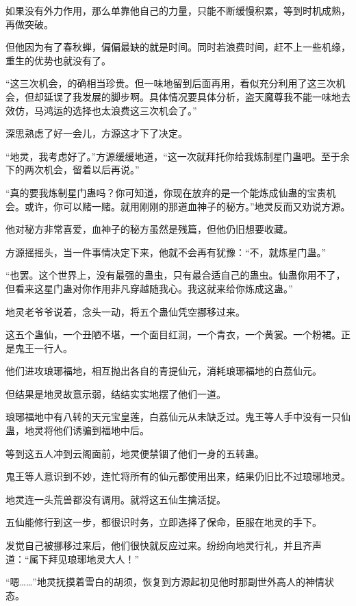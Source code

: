 
\begin{this_body}

如果没有外力作用，那么单靠他自己的力量，只能不断缓慢积累，等到时机成熟，再做突破。

但他因为有了春秋蝉，偏偏最缺的就是时间。同时若浪费时间，赶不上一些机缘，重生的优势也就没有了。

“这三次机会，的确相当珍贵。但一味地留到后面再用，看似充分利用了这三次机会，但却延误了我发展的脚步啊。具体情况要具体分析，盗天魔尊我不能一味地去效仿，马鸿运的选择也太浪费这三次机会了。”

深思熟虑了好一会儿，方源这才下了决定。

“地灵，我考虑好了。”方源缓缓地道，“这一次就拜托你给我炼制星门蛊吧。至于余下的两次机会，留着以后再说。”

“真的要我炼制星门蛊吗？你可知道，你现在放弃的是一个能炼成仙蛊的宝贵机会。或许，你可以赌一赌。就用刚刚的那道血神子的秘方。”地灵反而又劝说方源。

他对秘方非常喜爱，血神子的秘方虽然是残篇，但他仍旧想要收藏。

方源摇摇头，当一件事情决定下来，他就不会再有犹豫：“不，就炼星门蛊。”

“也罢。这个世界上，没有最强的蛊虫，只有最合适自己的蛊虫。仙蛊你用不了，但看来这星门蛊对你作用非凡穿越随我心。我这就来给你炼成这蛊。”

地灵老爷爷说着，念头一动，将五个蛊仙凭空挪移过来。

这五个蛊仙，一个丑陋不堪，一个面目红润，一个青衣，一个黄裳。一个粉裙。正是鬼王一行人。

他们进攻琅琊福地，相互抛出各自的青提仙元，消耗琅琊福地的白荔仙元。

但结果是地灵故意示弱，结结实实地摆了他们一道。

琅琊福地中有八转的天元宝皇莲，白荔仙元从未缺乏过。鬼王等人手中没有一只仙蛊，地灵将他们诱骗到福地中后。

等到这五人冲到云阁面前，地灵便禁锢了他们一身的五转蛊。

鬼王等人意识到不妙，连忙将所有的仙元都使用出来，结果仍旧比不过琅琊地灵。

地灵连一头荒兽都没有调用。就将这五仙生擒活捉。

五仙能修行到这一步，都很识时务，立即选择了保命，臣服在地灵的手下。

发觉自己被挪移过来后，他们很快就反应过来。纷纷向地灵行礼，并且齐声道：“属下拜见琅琊地灵大人！”

“嗯……”地灵抚摸着雪白的胡须，恢复到方源起初见他时那副世外高人的神情状态。


\end{this_body}
